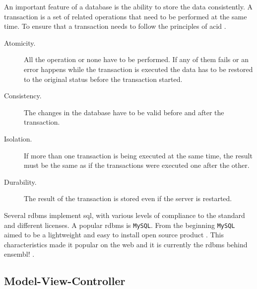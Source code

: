 An important feature of a database is the ability to store the 
data consistently.
A transaction is a set of related operations that need to be performed at the same time.  
To ensure that a transaction needs to follow the principles of \gls{acid} \citep{Haerder1983}.


\begin{description}
\item[Atomicity.] All the operation or none have to be performed. If any of them fails or an error happens while the transaction is executed the data has to be restored to the original status before the transaction started. 
\item[Consistency.] The changes in the database have to be valid before and after the transaction. 
\item[Isolation.] If more than one transaction is being executed at the same time, the result must be the same as if the transactions were executed one after the other. 
\item[Durability.] The result of the transaction is stored even if the server is restarted.
\end{description}  


Several \gls{rdbms} implement \acrshort{sql}, with various levels of compliance to the standard and different licenses.  
A popular \acrshort{rdbms} is \texttt{MySQL}.
From the beginning \texttt{MySQL} aimed to be a lightweight and easy to install open source product \citep{Oracle2014}. 
This characteristics made it popular on the web and it is currently the \gls{rdbms} behind ensembl! \citep{Flicek2012}. 

\subsection{Model-View-Controller}

